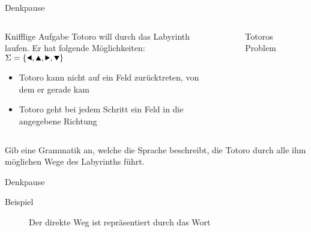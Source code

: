 {
\begin{frame}{Denkpause}
    \begin{columns}
        \begin{alertblock}{Knifflige Aufgabe}
            Totoro will durch das Labyrinth laufen. Er hat folgende Möglichkeiten:\\
            $\Sigma = \{\text{\Rewind}, \text{\MoveUp}, \text{\Forward}, \text{\MoveDown}\}$
            \begin{itemize}
                \item Totoro kann nicht auf ein Feld zurücktreten, von dem er gerade kam
                \item Totoro geht bei jedem Schritt ein Feld in die angegebene Richtung
            \end{itemize}
        \end{alertblock}
        \begin{figure}
            \centering
            
            \caption{Totoros Problem}

        \end{figure}
    \end{columns}
    \alert{Gib eine Grammatik an, welche die Sprache beschreibt, die Totoro durch alle ihm möglichen Wege des Labyrinths führt.}
\end{frame}
}

{
\begin{frame}{Denkpause}
    \begin{alertblock}{Beispiel}
        \begin{figure}
            \centering
            \def\labyrinthVariant{Direkt}
            \def\labyrinthSize{0.9\textwidth}
            
            \caption{Der direkte Weg ist repräsentiert durch das Wort \alert{\MoveDown\Forward\Forward\Forward\Forward\Forward\Forward}}
        \end{figure}
    \end{alertblock}
\end{frame}
}

